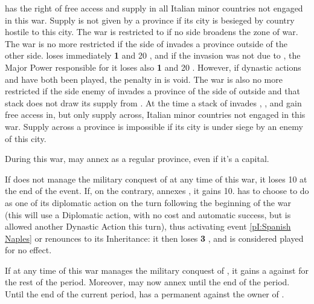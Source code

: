 \phmil
{} \FRA has the right of free access and supply in
all Italian minor countries not engaged in this war. Supply is not given by a
province if its city is besieged by country hostile to this city.
\bparag The war is restricted to \regionItalie if no side broadens the zone of
war.
\bparag The war is no more restricted if the side of \FRA invades a province
outside \regionItalie of the other side. \FRA loses immediately {\bf 1} \STAB
and 20 \VP, and if the invasion was not due to \FRA, the Major Power
responsible for it loses also {\bf 1} \STAB and 20 \VP. However, if dynastic
actions  and  have both
been played, the penalty in \VP is void.
\bparag The war is also no more restricted if the side enemy of \FRA invades a
province of the side of \FRA outside \regionItalie and that stack does not
draw its supply from \regionItalie.
\aparag At the time a stack of \FRA invades \provinceCampania, \FRA, \SPA and
\HAB gain free access in, but only supply across, Italian minor countries not
engaged in this war. Supply across a province is impossible if its city is
under siege by an enemy of this city.

\phpaix
\aparag During this war, \FRA may annex \provinceCampania as a regular
province, even if it's a capital.

\phinter
\aparag If \FRA does not manage the military conquest of  at any
time of this war, it loses 10 \VP at the end of the event.
\aparag If, on the contrary, \FRA annexes \provinceCampania, it gains 10\VP.
 \SPA has to choose to do  as
one of its diplomatic action on the turn following the beginning of the war
(this will use a Diplomatic action, with no cost and automatic success, but
\SPA is allowed another Dynastic Action this turn), thus activating event
\ref{pI:Spanish Naples} or renounces to its Inheritance: it then loses {\bf 3}
\STAB, and  is considered played for no effect.

\effetlong
\aparag If at any time of this war \FRA manages the military conquest of
, it gains a \CB against \TUR for the rest of the period.
Moreover, \FRA may now annex \provinceTrakya until the end of the period.
\aparag Until the end of the current period, \FRA has a permanent \CB against
the owner of \provinceCampania.




